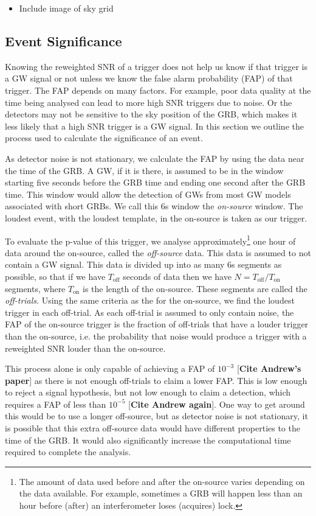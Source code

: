 \documentclass[11pt]{cuthesis}
\begin{document}
\begin{itemize}
\item Include image of sky grid
\end{itemize}


\subsection{Event Significance}
Knowing the reweighted SNR of a trigger does not help us know if that trigger is a GW signal or not unless we know the false alarm probability (FAP) of that trigger. The FAP depends on many factors. For example, poor data quality at the time being analysed can lead to more high SNR triggers due to noise. Or the detectors may not be sensitive to the sky position of the GRB, which makes it less likely that a high SNR trigger is a GW signal. In this section we outline the process used to calculate the significance of an event. 

As detector noise is not stationary, we calculate the FAP by using the data near the time of the GRB. A GW, if it is there, is assumed to be in the window starting five seconds before the GRB time and ending one second after the GRB time. This window would allow the detection of GWs from most GW models associated with short GRBs. We call this 6s window the \textit{on-source} window. The loudest event, with the loudest template, in the on-source is taken as our trigger. 

To evaluate the p-value of this trigger, we analyse approximately\footnote{The amount of data used before and after the on-source varies depending on the data available. For example, sometimes a GRB will happen less than an hour before (after) an interferometer loses (acquires) lock.} one hour of data around the on-source, called the \textit{off-source} data. This data is assumed to not contain a GW signal. This data is divided up into as many 6s segments as possible, so that if we have $T_\text{off}$ seconds of data then we have $N=T_\text{off} / T_\text{on}$ segments, where $T_\text{on}$ is the length of the on-source. These segments are called the \textit{off-trials}. Using the same criteria as the for the on-source, we find the loudest trigger in each off-trial. As each off-trial is assumed to only contain noise, the FAP of the on-source trigger is the fraction of off-trials that have a louder trigger than the on-source, i.e. the probability that noise would produce a trigger with a reweighted SNR louder than the on-source. 

This process alone is only capable of achieving a FAP of $10^{-3}$ [\textbf{Cite Andrew's paper}] as there is not enough off-trials to claim a lower FAP. This is low enough to reject a signal hypothesis, but not low enough to claim a detection, which requires a FAP of less than $10^{-5}$ [\textbf{Cite Andrew again}]. One way to get around this would be to use a longer off-source, but as detector noise is not stationary, it is possible that this extra off-source data would have different properties to the time of the GRB. It would also significantly increase the computational time required to complete the analysis. 
\end{document}
